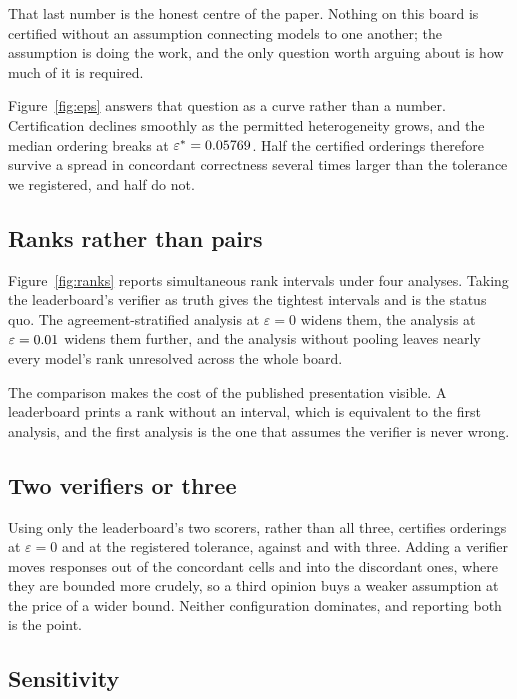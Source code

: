 That last number is the honest centre of the paper. Nothing on this board is certified without
an assumption connecting models to one another; the assumption is doing the work, and the only
question worth arguing about is how much of it is required.

Figure~\ref{fig:eps} answers that question as a curve rather than a number. Certification
declines smoothly as the permitted heterogeneity grows, and the median ordering breaks at
$\varepsilon^* = 0.05769$. Half the certified orderings therefore survive a spread in
concordant correctness several times larger than the tolerance we registered, and half do not.

\subsection{Ranks rather than pairs}

Figure~\ref{fig:ranks} reports simultaneous rank intervals under four analyses. Taking the
leaderboard's verifier as truth gives the tightest intervals and is the status quo. The
agreement-stratified analysis at $\varepsilon = 0$ widens them, the analysis at
$\varepsilon = 0.01$ widens them further, and the analysis without pooling leaves nearly
every model's rank unresolved across the whole board.

The comparison makes the cost of the published presentation visible. A leaderboard prints a
rank without an interval, which is equivalent to the first analysis, and the first analysis is
the one that assumes the verifier is never wrong.

\subsection{Two verifiers or three}

Using only the leaderboard's two scorers, rather than all three, certifies
\CertKTwoEpsZero{} orderings at $\varepsilon = 0$ and \CertKTwoPrereg{} at the registered
tolerance, against \CertEpsZero{} and \CertPrereg{} with three. Adding a verifier moves
responses out of the concordant cells and into the discordant ones, where they are bounded
more crudely, so a third opinion buys a weaker assumption at the price of a wider bound.
Neither configuration dominates, and reporting both is the point.

\subsection{Sensitivity}

